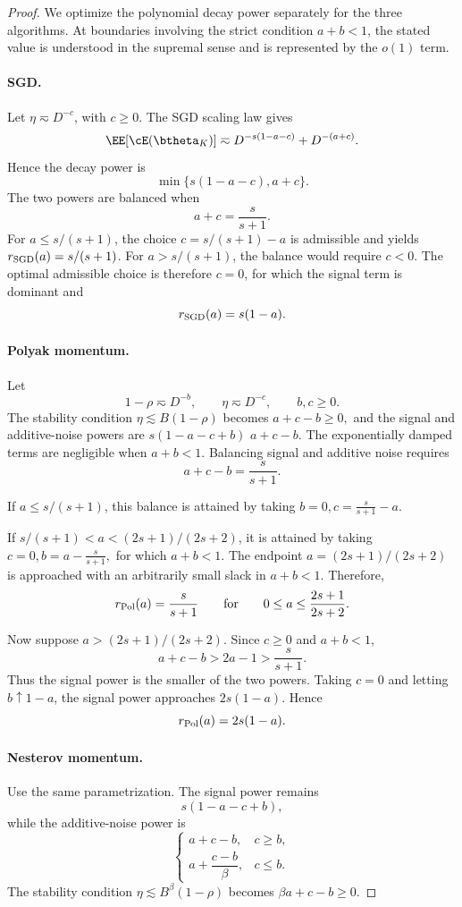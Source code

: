 \begin{proof}
We optimize the polynomial decay power separately for the three algorithms. At boundaries involving the strict condition \(a+b<1\), the stated value is understood in the supremal sense and is represented by the \(o(1)\) term.

\paragraph{SGD.}
Let \(\eta\eqsim D^{-c}\), with \(c\geq0\). The SGD scaling law gives
\[
\EE[\cE(\btheta_K)]
\eqsim
D^{-s(1-a-c)}+D^{-(a+c)}.
\]
Hence the decay power is
\[
\min\{s(1-a-c),a+c\}.
\]
The two powers are balanced when
\[
a+c=\frac{s}{s+1}.
\]
For \(a\leq s/(s+1)\), the choice \(c=s/(s+1)-a\) is admissible and yields \(r_{\rm SGD}(a)=s/(s+1)\). For \(a>s/(s+1)\), the balance would require \(c<0\). The optimal admissible choice is therefore \(c=0\), for which the signal term is dominant and
\[
r_{\rm SGD}(a)=s(1-a).
\]

\paragraph{Polyak momentum.}
Let
\[
1-\rho\eqsim D^{-b},
\qquad
\eta\eqsim D^{-c},
\qquad
b,c\geq0.
\]
The stability condition \(\eta\lesssim B(1-\rho)\) becomes
\(a+c-b\geq0,\)
and the signal and additive-noise powers are
\(s(1-a-c+b)\)  \(a+c-b.\)
The exponentially damped terms are negligible when \(a+b<1\). Balancing signal and additive noise requires
\[
a+c-b=\frac{s}{s+1}.
\]

If \(a\leq s/(s+1)\), this balance is attained by taking
\(b=0, c=\frac{s}{s+1}-a.\)

If \(s/(s+1)<a<(2s+1)/(2s+2)\), it is attained by taking
\(c=0, b=a-\frac{s}{s+1},\)
for which \(a+b<1\). The endpoint \(a=(2s+1)/(2s+2)\) is approached with an arbitrarily small slack in \(a+b<1\). Therefore,
\[
r_{\rm Pol}(a)=\frac{s}{s+1}
\qquad\text{for}\qquad
0\leq a\leq\frac{2s+1}{2s+2}.
\]

Now suppose \(a>(2s+1)/(2s+2)\). Since \(c\geq0\) and \(a+b<1\),
\[
a+c-b>2a-1>\frac{s}{s+1}.
\]
Thus the signal power is the smaller of the two powers. Taking \(c=0\) and letting \(b\uparrow1-a\), the signal power approaches \(2s(1-a)\). Hence
\[
r_{\rm Pol}(a)=2s(1-a).
\]

\paragraph{Nesterov momentum.}
Use the same parametrization. The signal power remains
\[
s(1-a-c+b),
\]
while the additive-noise power is
\[
\begin{cases}
a+c-b, & c\geq b,\\[1mm]
a+\dfrac{c-b}{\beta}, & c\leq b.
\end{cases}
\]
The stability condition \(\eta\lesssim B^\beta(1-\rho)\) becomes
\(\beta a+c-b\geq0.\)


\end{proof}

